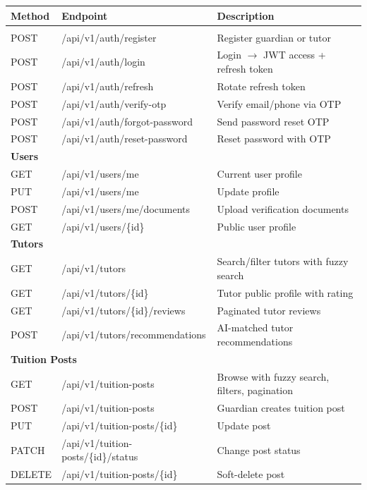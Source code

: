 \documentclass[12pt,a4paper,twoside]{report}
\begin{document}
\begin{longtable}{p{1.5cm}|p{6cm}|p{6cm}}
\toprule
\textbf{Method} & \textbf{Endpoint} & \textbf{Description} \\
\midrule
\endhead
\bottomrule
\endfoot
\multicolumn{3}{l}{\textbf{Authentication}} \\
POST & /api/v1/auth/register & Register guardian or tutor \\
POST & /api/v1/auth/login & Login $\to$ JWT access + refresh token \\
POST & /api/v1/auth/refresh & Rotate refresh token \\
POST & /api/v1/auth/verify-otp & Verify email/phone via OTP \\
POST & /api/v1/auth/forgot-password & Send password reset OTP \\
POST & /api/v1/auth/reset-password & Reset password with OTP \\

\multicolumn{3}{l}{\textbf{Users}} \\
GET  & /api/v1/users/me & Current user profile \\
PUT  & /api/v1/users/me & Update profile \\
POST & /api/v1/users/me/documents & Upload verification documents \\
GET  & /api/v1/users/\{id\} & Public user profile \\

\multicolumn{3}{l}{\textbf{Tutors}} \\
GET  & /api/v1/tutors & Search/filter tutors with fuzzy search \\
GET  & /api/v1/tutors/\{id\} & Tutor public profile with rating \\
GET  & /api/v1/tutors/\{id\}/reviews & Paginated tutor reviews \\
POST & /api/v1/tutors/recommendations & AI-matched tutor recommendations \\

\multicolumn{3}{l}{\textbf{Tuition Posts}} \\
GET  & /api/v1/tuition-posts & Browse with fuzzy search, filters, pagination \\
POST & /api/v1/tuition-posts & Guardian creates tuition post \\
PUT  & /api/v1/tuition-posts/\{id\} & Update post \\
PATCH & /api/v1/tuition-posts/\{id\}/status & Change post status \\
DELETE & /api/v1/tuition-posts/\{id\} & Soft-delete post \\


\end{longtable}
\end{document}
